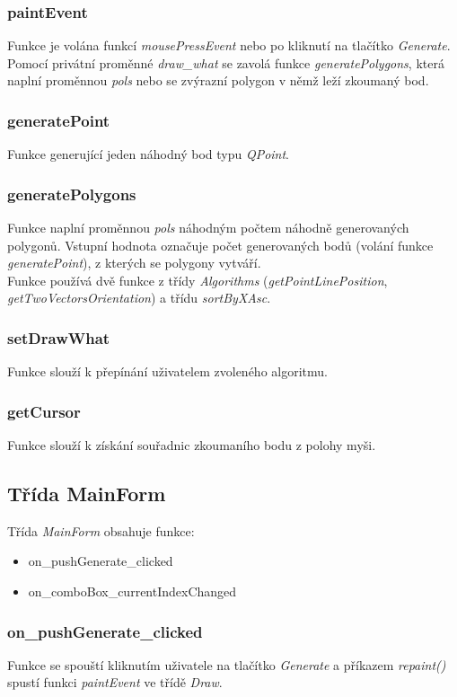 \documentclass{article}
\begin{document}
\subsubsection{paintEvent}
Funkce je volána funkcí \emph{mousePressEvent} nebo po kliknutí na tlačítko \emph{Generate}. Pomocí privátní proměnné \emph{draw\_what} se zavolá funkce \emph{generatePolygons}, která naplní proměnnou \emph{pols} nebo se zvýrazní polygon v němž leží zkoumaný bod.

\subsubsection{generatePoint}
Funkce generující jeden náhodný bod typu\emph{ QPoint}.

\subsubsection{generatePolygons}
Funkce naplní proměnnou \emph{pols} náhodným počtem náhodně generovaných polygonů. Vstupní hodnota označuje počet generovaných bodů (volání funkce \emph{generatePoint}), z kterých se polygony vytváří.\\
Funkce používá dvě funkce z třídy \emph{Algorithms} (\emph{getPointLinePosition}, \emph{getTwoVectorsOrientation}) a třídu \emph{sortByXAsc}. 

\subsubsection{setDrawWhat}
Funkce slouží k přepínání uživatelem zvoleného algoritmu.

\subsubsection{getCursor}
Funkce slouží k získání souřadnic zkoumaního bodu z polohy myši.

\subsection{Třída MainForm}
Třída \emph{MainForm} obsahuje funkce:
\begin{itemize}
\item on\_pushGenerate\_clicked
\item on\_comboBox\_currentIndexChanged
\end{itemize}

\subsubsection{on\_pushGenerate\_clicked}
Funkce se spouští kliknutím uživatele na tlačítko \emph{Generate} a příkazem \emph{repaint()} spustí funkci \emph{paintEvent} ve třídě \emph{Draw}.
\end{document}

